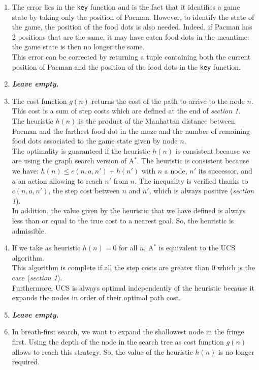 \documentclass{article}
\begin{document}
\begin{enumerate}[label=\alph*.,leftmargin=1.35em]
    \item The error lies in the \texttt{key} function and is the fact that it identifies a game state by taking only the position of Pacman. However, to identify the state of the game, the position of the food dots is also needed. Indeed, if Pacman has 2 positions that are the same, it may have eaten food dots in the meantime: the game state is then no longer the same.\\
          This error can be corrected by returning a tuple containing both the current position of Pacman and the position of the food dots in the \texttt{key} function.  
    \item \textbf{{\it Leave empty.}}
    \item The cost function $g(n)$ returns the cost of the path to arrive to the node $n$. This cost is a sum of step costs which are defined at the end of \textit{section 1}.\\
    The heuristic $h(n)$ is the product of the Manhattan distance between Pacman and the farthest food dot in the maze and the number of remaining food dots associated to the game state given by node $n$.\\
    The optimality is guaranteed if the heuristic $h(n)$ is consistent because we are using the graph search version of A$^*$. The heuristic is consistent because we have: $h(n) \leq c(n,a,n') + h(n')$ with $n$ a node, $n'$ its successor, and $a$ an action allowing to reach $n'$ from $n$. The inequality is verified thanks to $c(n,a,n')$, the step cost between $n$ and $n'$, which is always positive (\textit{section 1}).\\
    In addition, the value given by the heuristic that we have defined is always less than or equal to the true cost to a nearest goal. So, the heuristic is admissible.
    \item If we take as heuristic $h(n) = 0$ for all $n$, A$^*$ is equivalent to the UCS algorithm.\\
    This algorithm is complete if all the step costs are greater than 0 which is the case (\textit{section 1}).\\
    Furthermore, UCS is always optimal independently of the heuristic because it expands the nodes in order of their optimal path cost.
    \item \textbf{{\it Leave empty.}}
    \item In breath-first search, we want to expand the shallowest node in the fringe first. Using the depth of the node in the search tree as cost function $g(n)$ allows to reach this strategy. So, the value of the heuristic $h(n)$ is no longer required.
\end{enumerate}
\end{document}
